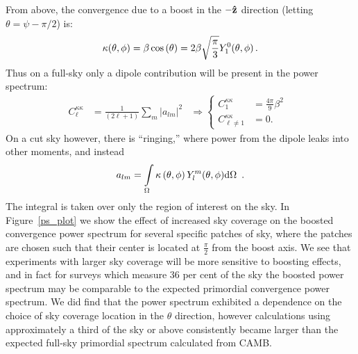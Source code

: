 \documentclass[useAMS,fleqn, usenatbib]{mn2e}
\begin{document}
From above, the convergence due to a boost in the $-{\bf\hat{z}}$ direction 
(letting $\theta =\psi-\pi/2 $) is: 
\begin{equation}
\kappa\mbox{\ensuremath{\left(\theta,\phi\right)}}=\beta\cos\left(\theta\right)=2\beta\sqrt{\frac{\pi}{3}}Y_{1}^{0}(\theta,\phi)\,.
\end{equation}
Thus on a full-sky only a dipole contribution will be present in the
power spectrum:
\begin{eqnarray}
C^{\kappa\kappa}_{\ell} & =\frac{1}{(2\ell+1)}\sum_{m}|a_{lm}|^{2} & \Rightarrow\begin{cases}
C^{\kappa\kappa}_{1} &\!\!\!\!\! = \frac{4\pi}{9}\beta^{2}\\
C^{\kappa\kappa}_{\ell\neq1} & \!\!\!\!\! =0 .
\end{cases}\,\,\,
\end{eqnarray}
 On a cut sky however, there is  ``ringing,'' where power
from the dipole leaks into other moments, and instead 
\begin{equation}
a_{lm}=\intop_{\Omega}\kappa\left(\theta,\phi\right)Y_{l}^{m}(\theta,\phi)\mathrm{d}\Omega\,\,\, .
\end{equation}
The integral is taken over only the region of interest on the sky. In Figure~\ref{ps_plot}
we show the effect of increased sky coverage on the boosted convergence power spectrum for several specific
patches of sky, where the patches are chosen such that their center is located at $\frac{\pi}{2}$ from the 
boost axis. We see that experiments with larger sky coverage will be more sensitive to boosting effects,
and in fact for surveys which measure 36 per cent of the sky the boosted power spectrum may
be comparable to the expected primordial convergence power spectrum. We did find that
the power spectrum exhibited a dependence on the choice of sky coverage location in the 
$\theta$ direction, however calculations using approximately a third of the sky or above consistently became
larger than the expected full-sky primordial spectrum calculated from CAMB.
\end{document}
